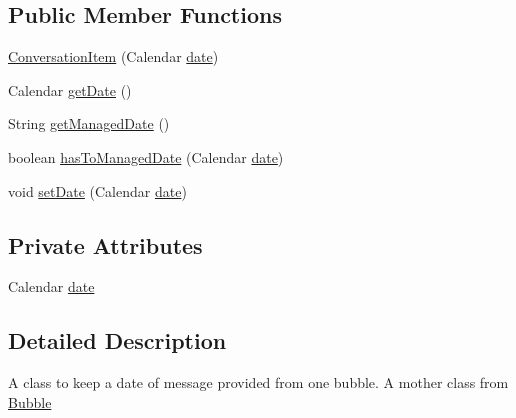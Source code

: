 \subsection*{Public Member Functions}
\begin{DoxyCompactItemize}
\item 
\hyperlink{a00008_ae50f1143e886a4a835296609372ec04a}{Conversation\+Item} (Calendar \hyperlink{a00008_aa713d1025d73543bd4eae313a1868570}{date})
\item 
Calendar \hyperlink{a00008_a91855ab66a4bb5c5e62f947170f29b10}{get\+Date} ()
\item 
String \hyperlink{a00008_aa53441954dd0352c8b8964194365c688}{get\+Managed\+Date} ()
\item 
boolean \hyperlink{a00008_abadf98014647b41c6a96847158d24230}{has\+To\+Managed\+Date} (Calendar \hyperlink{a00008_aa713d1025d73543bd4eae313a1868570}{date})
\item 
void \hyperlink{a00008_a65c1a5dad9225d01d585af72e0c80138}{set\+Date} (Calendar \hyperlink{a00008_aa713d1025d73543bd4eae313a1868570}{date})
\end{DoxyCompactItemize}
\subsection*{Private Attributes}
\begin{DoxyCompactItemize}
\item 
Calendar \hyperlink{a00008_aa713d1025d73543bd4eae313a1868570}{date}
\end{DoxyCompactItemize}


\subsection{Detailed Description}
A class to keep a date of message provided from one bubble. A mother class from \hyperlink{a00004}{Bubble} 


